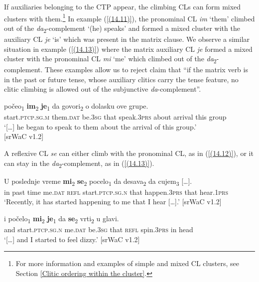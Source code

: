 \largerpage
\noindent If auxiliaries belonging to the CTP appear, the climbing CLs can form mixed clusters with them.\footnote{For more information and examples of simple and mixed CL clusters, see Section \ref{Clitic ordering within the cluster}.} In example (\ref{(14.11)}), the pronominal CL \textit{im} ‘them’ climbed out of the \textit{da}\textsubscript{2}-complement ‘(he) speaks’ and formed a mixed cluster with the auxiliary CL \textit{je} ‘is’ which was present in the matrix clause. We observe a similar situation in example (\ref{(14.13)}) where the matrix auxiliary CL \textit{je} formed a mixed cluster with the pronominal CL \textit{mi} ‘me’ which climbed out of the \textit{da}\textsubscript{2}-complement. These examples allow us to reject \citet[166]{Todorovic12} claim that “if the matrix verb is in the past or future tense, whose auxiliary clitics carry the tense feature, no clitic climbing is allowed out of the subjunctive \textit{da}-complement”. 

\begin{exe}\ex\label{(14.11)}
\gll [\dots] počeo\textsubscript{1} \textbf{im}\textsubscript{2} \textbf{je}\textsubscript{1} da govori\textsubscript{2} o dolasku ove grupe.\\
{} start.\textsc{ptcp.sg.m} them.\textsc{dat} be.\textsc{3sg} that speak.\textsc{3prs} about arrival this group\\
\glt ‘[\dots] he began to speak to them about the arrival of this group.’ \\
\hfill [srWaC v1.2]
\end{exe}

\noindent A reflexive CL \textit{se} can either climb with the pronominal CL, as in (\ref{(14.12)}), or it can stay in the \textit{da}\textsubscript{2}-complement, as in (\ref{(14.13)}).

\begin{exe}
\ex\label{(14.12)}
\gll U poslednje vreme \textbf{mi}\textsubscript{2} \textbf{se}\textsubscript{2} pocelo\textsubscript{1}  da desava\textsubscript{2} da {cujem\textsubscript{3} [\dots].} \\
in past time me.\textsc{dat} \textsc{refl} start.\textsc{ptcp.sg.n} that happen.\textsc{3prs} that hear.\textsc{1prs} \\ 
\glt ‘Recently, it has started happening to me that I hear [\dots].’
\hfill [srWaC v1.2]

\ex\label{(14.13)}
\gll [\dots] i počelo\textsubscript{1} \textbf{mi}\textsubscript{2} \textbf{je}\textsubscript{1} da \textbf{se}\textsubscript{2} vrti\textsubscript{2} u glavi.\\
{} and start.\textsc{ptcp.sg.n} me.\textsc{dat} be.\textsc{3sg} that \textsc{refl}  spin.\textsc{3prs} in head\\
\glt ‘[\dots] and I started to feel dizzy.’
\hfill [srWaC v1.2]
\end{exe}

